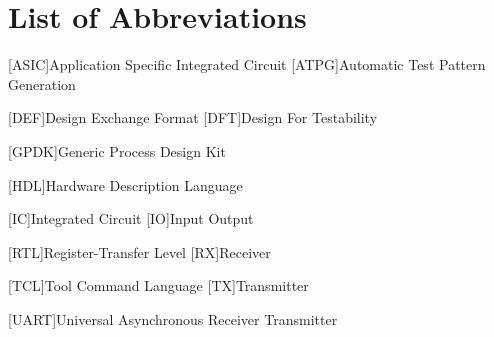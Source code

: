 \section*{List of Abbreviations}
\begin{acronym}
	[ASIC]{Application Specific Integrated Circuit}
	[ATPG]{Automatic Test Pattern Generation}
	
	[DEF]{Design Exchange Format}
	[DFT]{Design For Testability}
		
	[GPDK]{Generic Process Design Kit}
		
	[HDL]{Hardware Description Language}
	
	[IC]{Integrated Circuit}
	[IO]{Input Output}
		
	[RTL]{Register-Transfer Level}
	[RX]{Receiver}
		
	[TCL]{Tool Command Language}
	[TX]{Transmitter}
	
	[UART]{Universal Asynchronous Receiver Transmitter}
	
\end{acronym}


